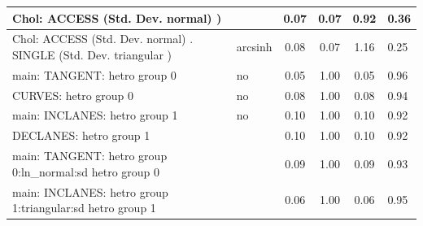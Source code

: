 \begin{table}
\begin{center}
\begin{tabular}{|l|l|c|c|c|l|}
			\hline
			 Chol: ACCESS (Std. Dev. normal) ) &  & 0.07 & 0.07 & 0.92 & 0.36 \\
			\hline
			 Chol: ACCESS (Std. Dev. normal) . SINGLE (Std. Dev.   triangular ) & arcsinh & 0.08 & 0.07 & 1.16 & 0.25 \\
			\hline
			main: TANGENT: hetro group 0 & no & 0.05 & 1.00 & 0.05 & 0.96 \\
			\hline
			CURVES: hetro group 0 & no & 0.08 & 1.00 & 0.08 & 0.94 \\
			\hline
			main: INCLANES: hetro group 1 & no & 0.10 & 1.00 & 0.10 & 0.92 \\
			\hline
			DECLANES: hetro group 1 &  & 0.10 & 1.00 & 0.10 & 0.92 \\
			\hline
			main: TANGENT: hetro group 0:ln_normal:sd  hetro group 0 &  & 0.09 & 1.00 & 0.09 & 0.93 \\
			\hline
			main: INCLANES: hetro group 1:triangular:sd  hetro group 1 &  & 0.06 & 1.00 & 0.06 & 0.95 \\
			\hline
		\end{tabular}
	\end{center}
\end{table}